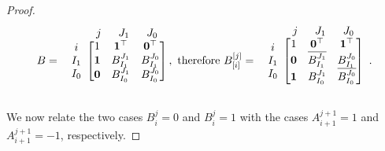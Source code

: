 \documentclass[10pt,a4paper]{amsart}
\begin{document}
\begin{proof}
$$B=\begin{array}{c@{}c}
& \begin{array}{lcc}
	j\;\; & J_1\;\; & J_0
\end{array}\\
\begin{array}{c}
	i\\I_1 \\ I_0
\end{array} &\begin{bmatrix}
	1 &\mathbf{1}^\top & \mathbf{0}^\top\\
	\mathbf{1} & B_{I_1}^{J_1} & B_{I_1}^{J_0} \\
	\mathbf{0} & B_{I_0}^{J_1} & B_{I_0}^{J_0} \\
\end{bmatrix}\\&\end{array}\!\!, \text{ therefore } B_{[i]}^{[j]}=\begin{array}{c@{}c}
& \begin{array}{ccc}
	j\;\; & J_1\;\; & J_0
\end{array}\\
\begin{array}{c}
	i\\I_1 \\ I_0
\end{array} &\begin{bmatrix}
	1 &\mathbf{0}^\top & \mathbf{1}^\top\\
	\mathbf{0} & \overline{B_{I_1}^{J_1}} & B_{I_1}^{J_0} \\
	\mathbf{1} & B_{I_0}^{J_1} & \overline{B_{I_0}^{J_0}} \\
\end{bmatrix}\\&\end{array}.$$

We now relate the two cases $B_i^j=0$ and $B_i^j=1$ with the cases $A_{i+1}^{j+1}=1$ and $A_{i+1}^{j+1}=-1$, respectively.


\end{proof}
\end{document}
